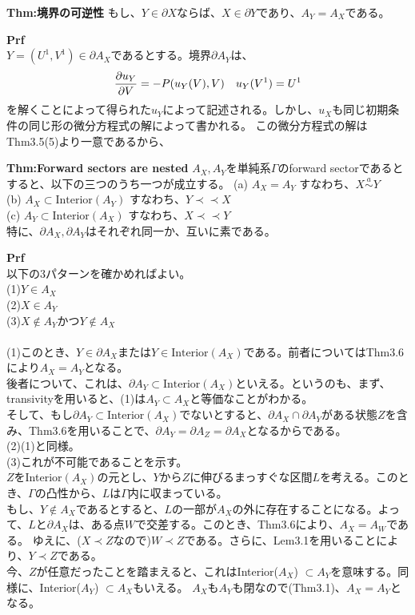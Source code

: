 \documentclass[a4paper,11pt]{jsarticle}
\numberwithin{equation}{section}
\begin{document}
\begin{itembox}[l]{\textbf{Thm:境界の可逆性}}
もし、$Y \in \partial X$ならば、$X \in \partial Y$であり、$A_Y = A_X$である。\\
\end{itembox}
\textbf{Prf}\\
$Y =(U^1,V^1)\in \partial A_X$であるとする。境界$\partial A_Y$は、
\begin{align}
    \pdv{u_Y}{V}(V) = -P(u_Y(V),V) \quad  u_Y(V^1) =U^1
\end{align}
を解くことによって得られた$u_Y$によって記述される。しかし、$u_X$も同じ初期条件の同じ形の微分方程式の解によって書かれる。
この微分方程式の解はThm3.5(5)より一意であるから、

\begin{itembox}[l]{\textbf{Thm:Forward sectors are nested}}
    $A_X,A_Y$を単純系$\Gamma$のforward sectorであるとすると、以下の三つのうち一つが成立する。
    (a) $A_X=A_Y$ すなわち、$X \overset{a}{\sim} Y$\\
    (b) $A_X \subset \text{Interior}(A_Y)$ すなわち、$Y \prec \prec X$\\
    (c) $A_Y \subset \text{Interior}(A_X)$ すなわち、$X \prec \prec Y$\\
    特に、$\partial A_X, \partial A_Y$はそれぞれ同一か、互いに素である。

\end{itembox}
\textbf{Prf}\\
以下の3パターンを確かめればよい。\\
(1)$Y \in A_X$\\
(2)$X \in A_Y$\\
(3)$X \notin A_Y$かつ$Y \notin A_X$\\
\\
(1)このとき、$Y \in \partial A_X$または$Y \in \text{Interior}(A_X)$である。前者についてはThm3.6により$A_X=A_Y$となる。\\
後者について、これは、$\partial A_Y \subset \text{Interior}(A_X)$といえる。というのも、まず、transivityを用いると、(1)は$A_Y \subset A_X$と等価なことがわかる。\\
そして、もし$\partial A_Y \subset \text{Interior}(A_X)$でないとすると、$\partial A_X \cap \partial A_Y$がある状態$Z$を含み、Thm3.6を用いることで、$\partial A_Y =\partial A_Z =\partial A_X $となるからである。\\
(2)(1)と同様。\\
(3)これが不可能であることを示す。\\
$Z$をInterior$(A_X)$の元とし、$Y$から$Z$に伸びるまっすぐな区間$L$を考える。このとき、$\Gamma$の凸性から、$L$は$\Gamma$内に収まっている。\\
もし、$Y \notin A_X$であるとすると、$L$の一部が$A_X$の外に存在することになる。よって、$L$と$\partial A_X$は、ある点$W$で交差する。このとき、Thm3.6により、$A_X=A_W$である。
ゆえに、($X \prec Z$なので)$W \prec Z$である。さらに、Lem3.1を用いることにより、$Y \prec Z$である。\\
今、$Z$が任意だったことを踏まえると、これはInterior($A_X$) $\subset A_Y$を意味する。同様に、Interior($A_Y$) $\subset A_X$もいえる。
$A_X$も$A_Y$も閉なので(Thm3.1)、$A_X =A_Y$となる。 \hfill \qedsymbol\\
\end{document}
